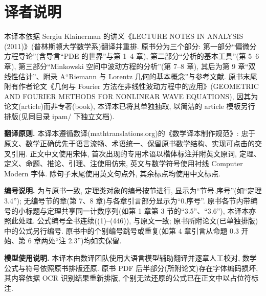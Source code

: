 \documentclass[
  BookTitleCN={分析讲义},
  BookTitleEN={LECTURE NOTES IN ANALYSIS (2011)},
  OriginalAuthor={Sergiu Klainerman},
  OriginalEdition={2011 年讲义(普林斯顿大学)},
  OriginalPublisher={Princeton University},
  OriginalYear={2011},
  Translator={Fingolfin},
  ModelUsed={DeepSeek-V4-Flash+混元3},
  TranslationDate={28 Aug 2026}
]{mathtranslation}
\begin{document}
\makecover

\setcounter{page}{1}
\pagestyle{plain}

\section*{译者说明}

本译本依据 Sergiu Klainerman 的讲义《LECTURE NOTES IN ANALYSIS (2011)》(普林斯顿大学数学系)翻译并重排. 原书分为三个部分: 第一部分``偏微分方程导论''(含导言``PDE 的世界''与第 1--4 章), 第二部分``分析的基本工具''(第 5--6 章), 第三部分``Minkowski 空间中波动方程的分析''(第 7--8 章), 其后为第 9 章``双线性估计''、附录 A``Riemann 与 Lorentz 几何的基本概念''与参考文献. 原书末尾附有作者论文《几何与 Fourier 方法在非线性波动方程中的应用》(GEOMETRIC AND FOURIER METHODS FOR NONLINEAR WAVE EQUATIONS), 因其为论文(article)而非专著(book), 本译本已将其单独抽取, 以简洁的 article 模板另行排版(见同目录 ipam/ 下独立文档).

\textbf{翻译原则.} 本译本遵循数译(mathtranslations.org)的《数学译本制作规范》: 忠于原文、数学正确优先于语言流畅、术语统一、保留原书数学结构、实现可点击的交叉引用. 正文中文使用宋体, 首次出现的专用术语以楷体标注并附英文原词, 定理、定义、命题、推论、引理、注使用仿宋, 英文与数学符号使用衬线 Computer Modern 字体. 除句子末尾使用英文句点外, 其余标点均使用中文标点.

\textbf{编号说明.} 为与原书一致, 定理类对象的编号按节进行, 显示为``节号.序号''(如``定理 3.4''); 无编号节的章(第 7、8 章)与各章引言部分显示为``0.序号''. 原书各节内带编号的小标题与定理共享同一计数序列(如第 1 章第 3 节的``3.5''、``3.6''), 本译本亦照此处理. 公式编号全书连续((1)--(446)), 与原文一致; 原书所附论文(已单独排版)中的公式另行编号. 原书中的个别编号跳号或重复(如第 4 章引言从命题 0.3 开始、第 6 章两处``注 2.3'')均如实保留.

\textbf{模型使用说明.} 本译本由数译团队使用大语言模型辅助翻译并逐章人工校对, 数学公式与符号依照原书排版还原. 原书 PDF 后半部分(所附论文)存在字体编码损坏, 其内容依据 OCR 识别结果重新排版, 个别无法还原的公式已在正文中以占位符标注.

\vspace{0.5cm}
\hfill \Translator
\end{document}

